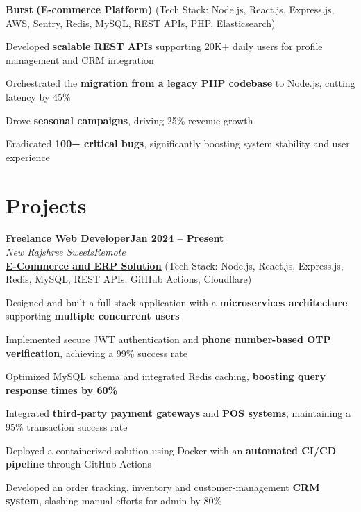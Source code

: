 \documentclass[letterpaper, 10pt]{article}
\newcommand{\heading}[2]{ \hspace{5pt}#1\hfill#2\\[1pt] }
\newcommand{\headingBf}[2]{ \heading{\textbf{#1}}{\textbf{#2}} }
\newcommand{\headingIt}[2]{ \heading{\textit{#1}}{\textit{#2}} }
\newenvironment{resume_list}{
\vspace{-3pt}
\begin{itemize}[itemsep=0.5pt, parsep=0.5pt, leftmargin=18pt] }{ \end{itemize}
\vspace{-3pt}
}
\begin{document}
\hspace{10pt}\textbf{Burst} \textbf{(E-commerce Platform)} \small{(Tech Stack: Node.js, React.js, Express.js, AWS, Sentry, Redis, MySQL, REST APIs, PHP, Elasticsearch)}
\begin{resume_list}
    \item Developed \textbf{scalable REST APIs} supporting 20K+ daily users for profile management and CRM integration
    \item Orchestrated the \textbf{migration from a legacy PHP codebase} to Node.js, cutting latency by 45\%
    \item Drove \textbf{seasonal campaigns}, driving 25\% revenue growth
    \item Eradicated \textbf{100+ critical bugs}, significantly boosting system stability and user experience
\end{resume_list}

\section{Projects}
\headingBf{Freelance Web Developer}{Jan 2024 -- Present}
\headingIt{New Rajshree Sweets}{Remote}
\hspace{10pt}\textbf{\href{https://newrajshreesweets.com}{\underline{E-Commerce and ERP Solution}}}
\small{(Tech Stack: Node.js, React.js, Express.js, Redis, MySQL, REST APIs, GitHub Actions, Cloudflare)}
\begin{resume_list}
    \item Designed and built a full-stack application with a \textbf{microservices architecture}, supporting \textbf{multiple concurrent users}
    \item Implemented secure JWT authentication and \textbf{phone number-based OTP verification}, achieving a 99\% success rate
    \item Optimized MySQL schema and integrated Redis caching, \textbf{boosting query response times by 60\%}
    \item Integrated \textbf{third-party payment gateways} and \textbf{POS systems}, maintaining a 95\% transaction success rate
    \item Deployed a containerized solution using Docker with an \textbf{automated CI/CD pipeline} through GitHub Actions
    \item Developed an order tracking, inventory and customer-management \textbf{CRM system}, slashing manual efforts for admin by 80\%
\end{resume_list}
\end{document}
